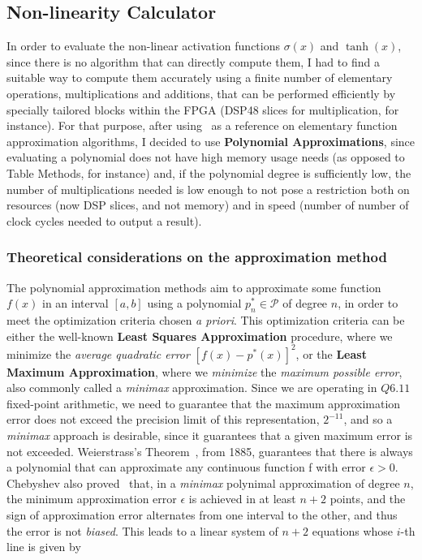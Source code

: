\subsection{Non-linearity Calculator}
In order to evaluate the non-linear activation functions $\sigma(x)$ and $\tanh(x)$, since there is no algorithm that can directly compute them, I had to find a suitable way to compute them accurately using a finite number of elementary operations, multiplications and additions, that can be performed efficiently by specially tailored blocks within the FPGA (DSP48 slices for multiplication, for instance). For that purpose, after using~\cite{Muller05} as a reference on elementary function approximation algorithms, I decided to use \textbf{Polynomial Approximations}, since evaluating a polynomial does not have high memory usage needs (as opposed to Table Methods, for instance) and, if the polynomial degree is sufficiently low, the number of multiplications needed is low enough to not pose a restriction both on resources (now DSP slices, and not memory) and in speed (number of number of clock cycles needed to output a result).

\subsubsection{Theoretical considerations on the approximation method}
The polynomial approximation methods aim to approximate some function $f(x)$ in an interval $\left[a, b\right]$ using a polynomial $p^*_n \in \mathcal{P}$ of degree $n$, in order to meet the optimization criteria chosen \textit{a priori}. This optimization criteria can be either the well-known \textbf{Least Squares Approximation} procedure, where we minimize the \emph{average quadratic error} $\left[f(x)-p^*(x)\right]^2$, or the \textbf{Least Maximum Approximation}, where we \emph{minimize} the \emph{maximum possible error}, also commonly called a \textit{minimax} approximation. Since we are operating in $Q6.11$ fixed-point arithmetic, we need to guarantee that the maximum approximation error does not exceed the precision limit of this representation, $2^{-11}$, and so a \textit{minimax} approach is desirable, since it guarantees that a given maximum error is not exceeded. Weierstrass's Theorem~\cite{Weierstrass1885}, from 1885, guarantees that there is always a polynomial that can approximate any continuous function f with error $\epsilon > 0$. Chebyshev also proved~\cite{Muller05} that, in a \textit{minimax} polynimal approximation of degree $n$, the minimum approximation error $\epsilon$ is achieved in at least $n+2$ points, and the sign of approximation error alternates from one interval to the other, and thus the error is not \emph{biased}. This leads to a linear system of $n+2$ equations whose $i$-th line is given by 

